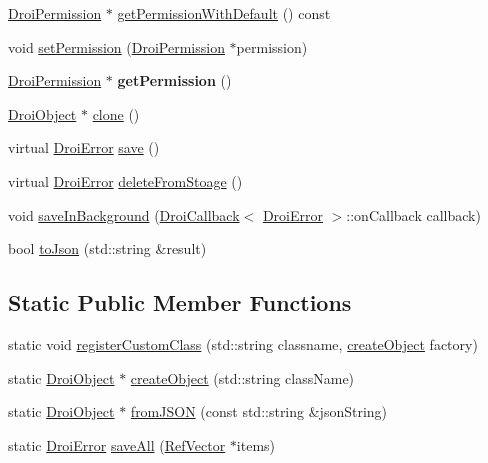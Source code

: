 \begin{DoxyCompactItemize}
\item 
\hyperlink{class_droi_permission}{Droi\+Permission} $\ast$ \hyperlink{class_droi_object_ac44409512c6e6bbf0c804819f99f0084}{get\+Permission\+With\+Default} () const
\item 
void \hyperlink{class_droi_object_a3988101bf6df709055f7c64ebb166474}{set\+Permission} (\hyperlink{class_droi_permission}{Droi\+Permission} $\ast$permission)
\item 
\mbox{\label{class_droi_object_a785c036d4bbf1f5a4e5abf5e4981bfbf}} 
\hyperlink{class_droi_permission}{Droi\+Permission} $\ast$ {\bfseries get\+Permission} ()
\item 
\hyperlink{class_droi_object}{Droi\+Object} $\ast$ \hyperlink{class_droi_object_a352b0f8d9994eccf3c104460f2329d65}{clone} ()
\item 
virtual \hyperlink{class_droi_error}{Droi\+Error} \hyperlink{class_droi_object_a2e5138d61ee8860b559300cf7446f085}{save} ()
\item 
virtual \hyperlink{class_droi_error}{Droi\+Error} \hyperlink{class_droi_object_ad79798fa3fc66256edfdb2ac85b1dc9c}{delete\+From\+Stoage} ()
\item 
void \hyperlink{class_droi_object_ac939667f3885dc36fc08c599e552fc64}{save\+In\+Background} (\hyperlink{struct_droi_callback}{Droi\+Callback}$<$ \hyperlink{class_droi_error}{Droi\+Error} $>$\+::on\+Callback callback)
\item 
bool \hyperlink{class_droi_object_a4ebd656ae5fafd1f27d97a21bae95996}{to\+Json} (std\+::string \&result)
\end{DoxyCompactItemize}
\subsection*{Static Public Member Functions}
\begin{DoxyCompactItemize}
\item 
static void \hyperlink{class_droi_object_a35f70b4ed21029d64b12fb9fde9f10f4}{register\+Custom\+Class} (std\+::string classname, \hyperlink{class_droi_object_af2570fc1461d2917f4f69444619e6600}{create\+Object} factory)
\item 
static \hyperlink{class_droi_object}{Droi\+Object} $\ast$ \hyperlink{class_droi_object_af2570fc1461d2917f4f69444619e6600}{create\+Object} (std\+::string class\+Name)
\item 
static \hyperlink{class_droi_object}{Droi\+Object} $\ast$ \hyperlink{class_droi_object_a00be8550f052b1e426969f9f0e3c0f39}{from\+J\+S\+ON} (const std\+::string \&json\+String)
\item 
static \hyperlink{class_droi_error}{Droi\+Error} \hyperlink{class_droi_object_ae9516e7686cd4a7dfacf0f81de6e552a}{save\+All} (\hyperlink{class_ref_vector}{Ref\+Vector} $\ast$items)
\end{DoxyCompactItemize}
